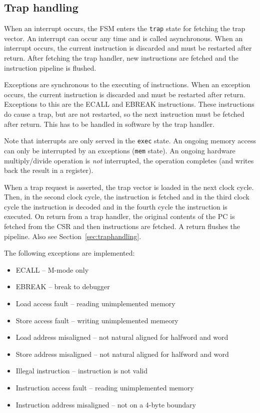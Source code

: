 \documentclass[12pt]{article}
\begin{document}
\subsection{Trap handling}
When an interrupt occurs, the FSM enters the \texttt{trap} state for fetching the trap vector. An interrupt can occur any time and is called asynchronous. When an interrupt occurs,
the current instruction is discarded and must be restarted after return. After fetching the trap handler, new instructions are fetched and the instruction pipeline is flushed.

Exceptions are synchronous to the executing of instructions. When an exception occurs, the current instruction is discarded and must be restarted after return. Exceptions to this are the ECALL and EBREAK instructions. These instructions do cause a trap, but are not restarted, so the next instruction must be fetched after return. This has to be handled in software by the trap handler. 

Note that interrupts are only served in the \lstinline|exec| state.
An ongoing memory access can only be interrupted by an exceptions (\lstinline|mem| state). An ongoing hardware multiply/divide operation is \emph{not} interrupted, the operation completes (and writes back the result in a register).

When a trap request is asserted, the trap vector is loaded in the next clock cycle. Then, in the second clock cycle, the instruction is fetched and in the third clock cycle the instruction is decoded and in the fourth cycle the instruction is executed. On return from a trap handler, the original contents of the PC is fetched from the CSR and then instructions are fetched. A return flushes the pipeline. Also see Section~\ref{sec:traphandling}.

The following exceptions are implemented:
\begin{itemize}
\item ECALL -- M-mode only
\item EBREAK -- break to debugger
\item Load access fault -- reading unimplemented memory
\item Store access fault -- writing unimplemented memeory
\item Load address misaligned -- not natural aligned for halfword and word
\item Store address misaligned -- not natural aligned for halfword and word
\item Illegal instruction -- instruction is not valid
\item Instruction access fault -- reading unimplemented memory
\item Instruction address misaligned -- not on a 4-byte boundary
\end{itemize}
\end{document}
